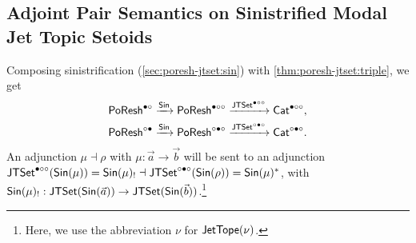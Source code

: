 \documentclass[a4paper]{memoir}
\begin{document}
{%

\subsection{Adjoint Pair Semantics on Sinistrified Modal Jet Topic Setoids} \label{sec:poresh-jtset:pair-sin}
Composing sinistrification (\cref{sec:poresh-jtset:sin}) with \ref{thm:poresh-jtset:triple}, we get
\begin{align*}
	&\mathsf{PoResh}^{\bullet \circ} \xrightarrow{{\mathsf{Sin}}} \mathsf{PoResh}^{\bullet \circ \circ} \xrightarrow{\mathsf{JTSet}^{\bullet \circ \circ}} {\mathsf{Cat}}^{\bullet \circ \circ}, \\
	&\mathsf{PoResh}^{\circ \bullet} \xrightarrow{{\mathsf{Sin}}} \mathsf{PoResh}^{\circ \bullet \circ} \xrightarrow{\mathsf{JTSet}^{\circ \bullet \circ}} {\mathsf{Cat}}^{\circ \bullet \circ}.
\end{align*}
An adjunction $\mu \dashv \rho$ with $\mu : \vec a \to \vec b$ will be sent to an adjunction $\mathsf{JTSet}^{\bullet \circ \circ}({\mathsf{Sin}}(\mu)) = {\mathsf{Sin}}(\mu)_! \dashv \mathsf{JTSet}^{\circ \bullet \circ}({\mathsf{Sin}}(\rho)) = {\mathsf{Sin}}(\mu)^*$, with ${\mathsf{Sin}}(\mu)_! : \mathsf{JTSet}({\mathsf{Sin}}(\vec a)) \to \mathsf{JTSet}({\mathsf{Sin}}(\vec b))$.\footnote{Here, we use the abbreviation $\nu$ for $\mathsf{JetTope}(\nu)$.}

}
\end{document}
